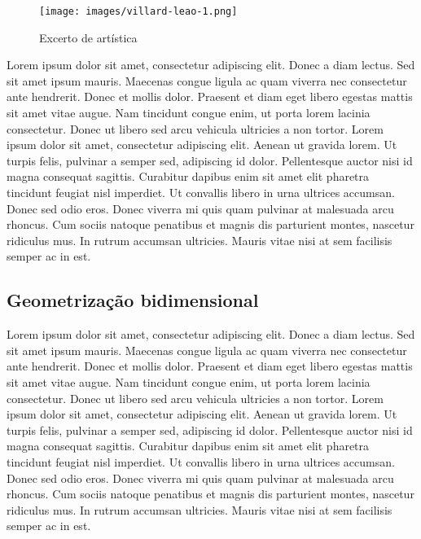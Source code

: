 \documentclass{article}
\begin{document}
\begin{figure}
  \centering\texttt{[image: images/villard-leao-1.png]}
  \caption{Excerto de \cite{hale1964} artística}
  \label{fig:villard-leao-1}
\end{figure}

Lorem ipsum dolor sit amet, consectetur adipiscing elit. Donec a diam lectus. Sed sit amet ipsum mauris. Maecenas congue ligula ac quam viverra nec consectetur ante hendrerit. Donec et mollis dolor. Praesent et diam eget libero egestas mattis sit amet vitae augue. Nam tincidunt congue enim, ut porta lorem lacinia consectetur. Donec ut libero sed arcu vehicula ultricies a non tortor. Lorem ipsum dolor sit amet, consectetur adipiscing elit. Aenean ut gravida lorem. Ut turpis felis, pulvinar a semper sed, adipiscing id dolor. Pellentesque auctor nisi id magna consequat sagittis. Curabitur dapibus enim sit amet elit pharetra tincidunt feugiat nisl imperdiet. Ut convallis libero in urna ultrices accumsan. Donec sed odio eros. Donec viverra mi quis quam pulvinar at malesuada arcu rhoncus. Cum sociis natoque penatibus et magnis dis parturient montes, nascetur ridiculus mus. In rutrum accumsan ultricies. Mauris vitae nisi at sem facilisis semper ac in est.

\subsection{Geometrização bidimensional}

Lorem ipsum dolor sit amet, consectetur adipiscing elit. Donec a diam lectus. Sed sit amet ipsum mauris. Maecenas congue ligula ac quam viverra nec consectetur ante hendrerit. Donec et mollis dolor. Praesent et diam eget libero egestas mattis sit amet vitae augue. Nam tincidunt congue enim, ut porta lorem lacinia consectetur. Donec ut libero sed arcu vehicula ultricies a non tortor. Lorem ipsum dolor sit amet, consectetur adipiscing elit. Aenean ut gravida lorem. Ut turpis felis, pulvinar a semper sed, adipiscing id dolor. Pellentesque auctor nisi id magna consequat sagittis. Curabitur dapibus enim sit amet elit pharetra tincidunt feugiat nisl imperdiet. Ut convallis libero in urna ultrices accumsan. Donec sed odio eros. Donec viverra mi quis quam pulvinar at malesuada arcu rhoncus. Cum sociis natoque penatibus et magnis dis parturient montes, nascetur ridiculus mus. In rutrum accumsan ultricies. Mauris vitae nisi at sem facilisis semper ac in est.
\end{document}
